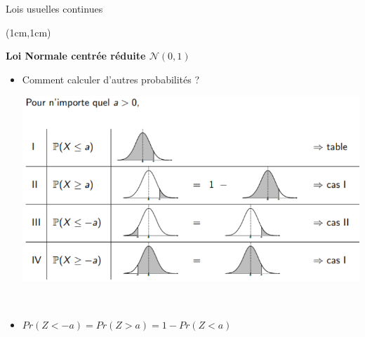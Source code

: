 \documentclass{beamer}
\begin{document}


\begin{frame}{Lois usuelles continues}
\begin{textblock*}{\textwidth}(1cm,1cm)

\begin{center}{\bf \Large Loi Normale centrée réduite $\mathcal{N}(0,1)$} \end{center}

\begin{itemize}

\item Comment calculer d'autres probabilités ? \\
\begin{center}
\includegraphics[scale=0.3]{images/LoiNcr.png}
\end{center}

\

\item $Pr(Z<-a)=Pr(Z>a)=1-Pr(Z<a)$

\end{itemize}

\end{textblock*}

\end{frame}



\end{document}
